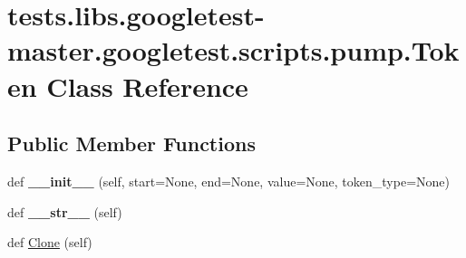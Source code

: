 \hypertarget{classtests_1_1libs_1_1googletest-master_1_1googletest_1_1scripts_1_1pump_1_1Token}{}\section{tests.\+libs.\+googletest-\/master.googletest.\+scripts.\+pump.\+Token Class Reference}
\label{classtests_1_1libs_1_1googletest-master_1_1googletest_1_1scripts_1_1pump_1_1Token}
\subsection*{Public Member Functions}
\begin{DoxyCompactItemize}
\item 
\mbox{\label{classtests_1_1libs_1_1googletest-master_1_1googletest_1_1scripts_1_1pump_1_1Token_aec24b1d5be7cfbee62188240a02cb343}} 
def {\bfseries \+\_\+\+\_\+init\+\_\+\+\_\+} (self, start=None, end=None, value=None, token\+\_\+type=None)
\item 
\mbox{\label{classtests_1_1libs_1_1googletest-master_1_1googletest_1_1scripts_1_1pump_1_1Token_a4808f884e1c34c967c510a67c63c3cd6}} 
def {\bfseries \+\_\+\+\_\+str\+\_\+\+\_\+} (self)
\item 
def \hyperlink{classtests_1_1libs_1_1googletest-master_1_1googletest_1_1scripts_1_1pump_1_1Token_a255eaf8ed32638600a692134244808fc}{Clone} (self)
\end{DoxyCompactItemize}

